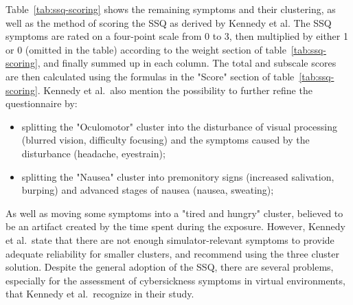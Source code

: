 Table~\ref{tab:ssq-scoring} shows the remaining symptoms and their clustering, as well as the method of scoring the
SSQ as derived by Kennedy et al.
The SSQ symptoms are rated on a four-point scale from 0 to 3, then multiplied by either 1 or 0 (omitted in the table)
according to the weight section of table~\ref{tab:ssq-scoring}, and finally summed up in each column.
The total and subscale scores are then calculated using the formulas in the "Score" section of
table~\ref{tab:ssq-scoring}.
Kennedy et al.\ also mention the possibility to further refine the questionnaire by:
\begin{itemize}
    \item splitting the "Oculomotor" cluster into the disturbance of visual processing (blurred vision, difficulty
    focusing) and the symptoms caused by the disturbance (headache, eyestrain);
    \item splitting the "Nausea" cluster into premonitory signs (increased salivation, burping) and advanced stages
    of nausea (nausea, sweating);
\end{itemize}
As well as moving some symptoms into a "tired and hungry" cluster, believed to be an artifact created by the time
spent during the exposure.
However, Kennedy et al.\ state that there are not enough simulator-relevant symptoms to provide adequate reliability
for smaller clusters, and recommend using the three cluster solution.
Despite the general adoption of the SSQ, there are several problems, especially for the assessment of
cybersickness symptoms in virtual environments, that Kennedy et al.\ recognize in their study.
